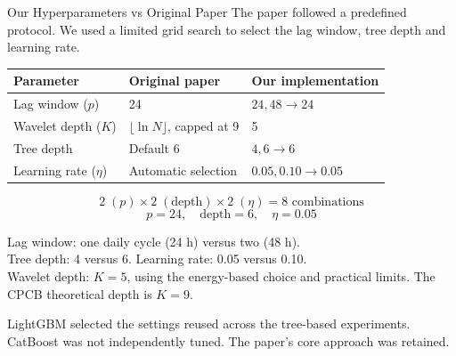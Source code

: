 \begin{frame}{Our Hyperparameters vs Original Paper}
  \small
  The paper followed a predefined protocol. We used a limited grid search
  to select the lag window, tree depth and learning rate.
  \medskip
  \centering
  {\scriptsize
  \begin{tabular}{lll}
    \toprule
    Parameter & Original paper & Our implementation \\
    \midrule
    Lag window ($p$) & 24 & $24,48 \rightarrow 24$ \\
    Wavelet depth ($K$) & $\lfloor\ln N\rfloor$, capped at 9 & 5 \\
    Tree depth & Default 6 & $4,6 \rightarrow 6$ \\
    Learning rate ($\eta$) & Automatic selection & $0.05,0.10 \rightarrow 0.05$ \\
    \bottomrule
  \end{tabular}
  }
  \[
    2\;(p)\times2\;(\mathrm{depth})\times2\;(\eta)
    =\boxed{8\text{ combinations}}
  \]
  \[
    \boxed{p=24,\quad \mathrm{depth}=6,\quad \eta=0.05}
  \]
  \begin{flushleft}
  \scriptsize
  Lag window: one daily cycle (24 h) versus two (48 h).\\
  Tree depth: 4 versus 6. Learning rate: 0.05 versus 0.10.\\
  Wavelet depth: $K=5$, using the energy-based choice and practical limits.
  The CPCB theoretical depth is $K=9$.\par\smallskip
  LightGBM selected the settings reused across the tree-based experiments.
  CatBoost was not independently tuned. The paper's core approach was retained.
  \end{flushleft}
\end{frame}


